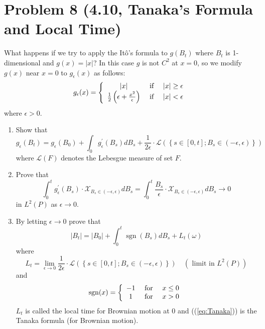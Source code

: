 \documentclass[11pt]{article}
\newcommand\abs[1]{\left|#1\right|}
\let\oldref\ref
\renewcommand{\ref}[1]{(\oldref{#1})}
\DeclareMathOperator{\sgn}{sgn}
\begin{document}
\section*{Problem 8 (4.10, Tanaka's Formula and Local Time)}
What happens if we try to apply the It\^o's formula to $g(B_t)$ where $B_t$ is  1-dimensional and $g(x) = \abs{x}$?  In this case $g$ is not $C^2$ at $x=0$, so we modify $g(x)$ near $x=0$ to $g_\epsilon(x)$ as follows:
$$
g _ { \epsilon } ( x ) = \left\{ \begin{array} { c c c } { | x | } & { \text { if } } & { | x | \geq \epsilon } \\ { \frac { 1 } { 2 } \left( \epsilon + \frac { x ^ { 2 } } { \epsilon } \right) } & { \text { if } } & { | x | < \epsilon } \end{array} \right.
$$
where $\epsilon>0$.
\begin{enumerate}
\item Show that 
$$
g _ { \epsilon } \left( B _ { t } \right) = g _ { \epsilon } \left( B _ { 0 } \right) + \int _ { 0 } g _ { \epsilon } ^ { \prime } \left( B _ { s } \right) d B _ { s } + \frac { 1 } { 2 \epsilon } \cdot \mathscr{L} \left( \left\{ s \in [ 0 , t ] ; B _ { s } \in ( - \epsilon , \epsilon ) \right\} \right)
$$
where $\mathscr{L}(F)$ denotes the Lebesgue measure of set $F$.
\item Prove that 
$$
\int _ { 0 } ^ { t } g _ { \epsilon } ^ { \prime } \left( B _ { s } \right) \cdot \mathcal { X } _ { B _ { s } \in ( - \epsilon , \epsilon ) } d B _ { s } = \int _ { 0 } ^ { t } \frac { B _ { s } } { \epsilon } \cdot \mathcal { X } _ { B _ { s } \in ( - \epsilon , \epsilon ) } d B _ { s } \rightarrow 0
$$
in $L^2(P)$ as $\epsilon \rightarrow 0$.
\item By letting $\epsilon \rightarrow 0$ prove that
$$
\left| B _ { t } \right| = \left| B _ { 0 } \right| + \int _ { 0 } ^ { t } \operatorname { sgn } \left( B _ { s } \right) d B _ { s } + L _ { t } ( \omega )
$$
where
$$\label{eq:Tanaka}
L _ { t } = \lim _ { \epsilon \rightarrow 0 } \frac { 1 } { 2 \epsilon } \cdot \mathscr{L} \left( \left\{ s \in [ 0 , t ] ; B _ { s } \in ( - \epsilon , \epsilon ) \right\} \right) \quad \left( \text { limit in } L ^ { 2 } ( P ) \right)
$$
and 
$$
\sgn ( x ) = \left\{ \begin{array} { c c c } { - 1 } & { \text { for } } & { x \leq 0 } \\ { 1 } & { \text { for } } & { x > 0 } \end{array} \right.
$$
$  L _ { t }$  is called the local time for Brownian motion at $0$ and  (\ref{eq:Tanaka})  is the Tanaka formula (for Brownian motion). 
\end{enumerate}
\end{document}

